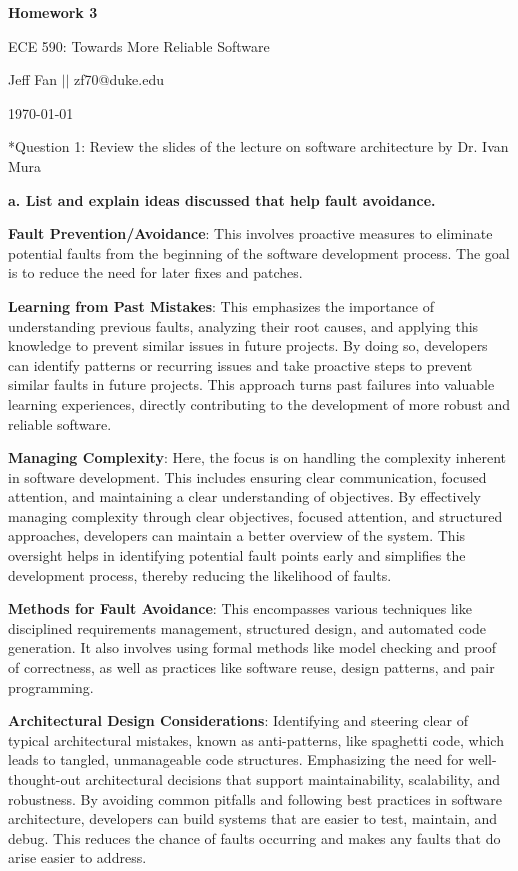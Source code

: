 \documentclass[12pt]{article}
\makeatletter
\numberwithin{table}{section}
\newcommand{\question}[2][]{\begin{flushleft}
		\Large\textbf{Question #1}: \large\textit{#2}
		
\end{flushleft}}
\newcommand{\maketitletwo}[2][]{\begin{center}
		\Large{\textbf{Homework #1}
			
			ECE 590: Towards More Reliable Software} %
		\vspace{5pt}
		
		\normalsize{Jeff Fan  \hspace{1em} $\left|\right|$ \hspace{1em}zf70@duke.edu  %
			
			\today}        %
		\vspace{15pt}
		
\end{center}}
\makeatother
\begin{document}
	\maketitletwo[3]  %
	
	\section*{Question 1: Review the slides of the lecture on software architecture by Dr. Ivan Mura} 
	
	\textbf{a. List and explain ideas discussed that help fault avoidance.}
	
	\textbf{Fault Prevention/Avoidance}: This involves proactive measures to eliminate potential faults from the beginning of the software development process. The goal is to reduce the need for later fixes and patches.
	
	\textbf{Learning from Past Mistakes}: This emphasizes the importance of understanding previous faults, analyzing their root causes, and applying this knowledge to prevent similar issues in future projects. By doing so, developers can identify patterns or recurring issues and take proactive steps to prevent similar faults in future projects. This approach turns past failures into valuable learning experiences, directly contributing to the development of more robust and reliable software.
	
	\textbf{Managing Complexity}: Here, the focus is on handling the complexity inherent in software development. This includes ensuring clear communication, focused attention, and maintaining a clear understanding of objectives. By effectively managing complexity through clear objectives, focused attention, and structured approaches, developers can maintain a better overview of the system. This oversight helps in identifying potential fault points early and simplifies the development process, thereby reducing the likelihood of faults.
	
	\textbf{Methods for Fault Avoidance}: This encompasses various techniques like disciplined requirements management, structured design, and automated code generation. It also involves using formal methods like model checking and proof of correctness, as well as practices like software reuse, design patterns, and pair programming.
	
	\textbf{Architectural Design Considerations}: Identifying and steering clear of typical architectural mistakes, known as anti-patterns, like spaghetti code, which leads to tangled, unmanageable code structures. Emphasizing the need for well-thought-out architectural decisions that support maintainability, scalability, and robustness. By avoiding common pitfalls and following best practices in software architecture, developers can build systems that are easier to test, maintain, and debug. This reduces the chance of faults occurring and makes any faults that do arise easier to address.
	
\end{document}
